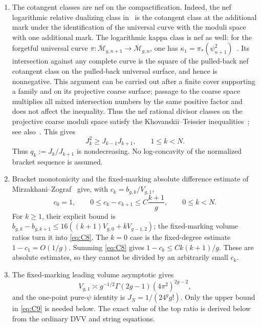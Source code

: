 \begin{enumerate}[label=\arabic*.]
\item
  The cotangent classes are nef on the compactification. Indeed, the
  nef logarithmic relative dualizing class in~\cite[Theorem~0.4]{Keel}
  is the cotangent class at the additional mark under the identification
  of the universal curve with the moduli space with one additional mark.
  The logarithmic
  kappa class is nef as well: for the forgetful universal curve
  \(\pi:\overline{\mathcal M}_{g,n+1}\to\overline{\mathcal M}_{g,n}\),
  one has \(\kappa_1=\pi_*(\psi_{n+1}^2)\)~\cite{AC}. Its intersection against any
  complete curve is the square of the pulled-back nef cotangent class on
  the pulled-back universal surface, and hence is nonnegative. This
  argument can be carried out after a finite cover supporting a family
  and on its projective coarse surface; passage to the coarse space
  multiplies all mixed intersection numbers by the same positive factor
  and does not affect the inequality.
  Thus the nef rational divisor classes on the projective coarse moduli
  space satisfy the Khovanskii--Teissier inequalities~\cite[Section~1.6]{Laz}; see also~\cite[Theorem~2.15]{BFJ}. This gives \begin{equation}
J_k^2\ge J_{k-1}J_{k+1},\qquad 1\le k<N.
  \label{eq:C7}
\end{equation} Thus \(q_k:=J_k/J_{k+1}\) is nondecreasing. No log-concavity of the
  normalized bracket sequence is assumed.
\item
  Bracket monotonicity and the fixed-marking absolute difference estimate of Mirzakhani--Zograf~\cite[Theorem~3.2(ii)]{MZ} give, with \(c_k=b_{g,k}/V_{g,1}\), \begin{equation}
c_0=1,\qquad 0\le c_k-c_{k+1}\le C\frac{k+1}{g},
  \qquad 0\le k<N.
  \label{eq:C8}
\end{equation} For \(k\ge1\), their explicit bound is
  \(b_{g,k}-b_{g,k+1}\le16((k+1)V_{g,0}+kV_{g-1,2})\); the fixed-marking
  volume ratios turn it into \eqref{eq:C8}. The \(k=0\) case is the fixed-degree
  estimate \(1-c_1=O(1/g)\). Summing \eqref{eq:C8} gives \(1-c_k\le Ck(k+1)/g\).
  These are absolute estimates, so they cannot be divided by an
  arbitrarily small \(c_k\).
\item
  The fixed-marking leading volume asymptotic gives \begin{equation}
V_{g,1}\asymp g^{-1/2}\Gamma(2g-1)
                      (4\pi^2)^{2g-2},
  \label{eq:C9}
\end{equation} and the one-point pure-$\psi$ identity is \(J_N=1/(24^g g!)\). Only
  the upper bound in \eqref{eq:C9} is needed below. The exact value of the top
  ratio is derived below from the ordinary DVV and string equations.
\end{enumerate}


